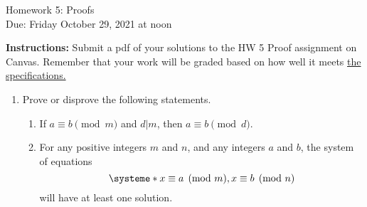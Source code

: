 \documentclass[10pt,a4paper]{article}
\begin{document}
\begin{center}
{\Large Homework 5: Proofs}\\
Due: Friday October 29, 2021 at noon\\


\end{center}
{\bf Instructions:} Submit a pdf of your solutions to the HW 5 Proof assignment on Canvas. Remember that your work will be graded based on how well it meets \href{https://docs.google.com/document/d/1emM06_WRh_h941rsjtRE9fRVndJtfRKd9gyS3Fs_rFA/edit?usp=sharing}{the specifications. }

\begin{enumerate}

 \item Prove or disprove the following statements. 
 \begin{enumerate}
 \item If $a\equiv b\pmod{m}$ and $d|m$, then $a\equiv b\pmod d$. 
 \item For any positive integers $m$ and $n$,  and any integers $a$ and $b$, the system of equations $$\systeme*{x\equiv a\pmod m, x\equiv b\pmod n}$$
  will have at least one solution. 
 \end{enumerate}

\end{enumerate}
\end{document}

